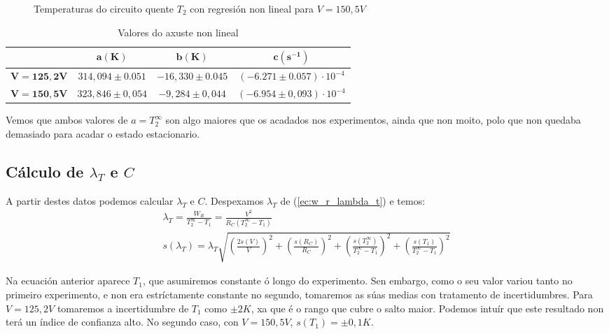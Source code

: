 \documentclass[12pt, a4paper, titlepage]{article}
\begin{document}
  \begin{figure}[H]
    \hspace{12pt}
    
    \caption{Temperaturas do circuito quente $T_2$ con regresión non lineal para $V = 150,5V$}
    \label{fig:v150ar}
  \end{figure}

  \begin{table}[H]
    \centering
    \begin{tabular}{c|c|c|c|}
    \cline{2-4}
                                                & $\mathbf{a(K)}$               & $\mathbf{b(K)}$               & $\mathbf{c(s^{-1})}$   \\ \hline
    \multicolumn{1}{|c|}{$\mathbf{V = 125,2V}$} & $314,094 \pm 0.051$              & $-16,330 \pm 0.045$             & $(-6.271 \pm 0.057) \cdot 10^{-4}$ \\ \hline
    \multicolumn{1}{|c|}{$\mathbf{V = 150,5V}$} & $323,846 \pm 0,054$ & $-9,284 \pm 0,044$ & $(-6.954 \pm 0,093) \cdot 10^{-4}$ \\ \hline
    \end{tabular}
    \caption{Valores do axuste non lineal}
    \label{cadro:4}
  \end{table}

  Vemos que ambos valores de $a = T_2^\infty$ son algo maiores que os acadados nos experimentos, ainda que non moito, polo que non quedaba demasiado para acadar o estado estacionario.

  \subsection{Cálculo de $\lambda_T$ e $C$}

  A partir destes datos podemos calcular $\lambda_T$ e $C$. Despexamos $\lambda_T$ de (\ref{ec:w_r_lambda_t}) e temos:
  \begin{gather}
    \lambda_T = \frac{W_R}{T_2^\infty - T_1} = \frac{V^2}{R_C (T_2^\infty - T_1)} \\
    s(\lambda_T) = \lambda_T \sqrt{\left( \frac{2s(V)}{V} \right)^2 + \left( \frac{s(R_C)}{R_C} \right)^2 + \left( \frac{s(T_2^\infty)}{T_2^\infty - T_1} \right)^2 + \left( \frac{s(T_1)}{T_2^\infty - T_1} \right)^2}
  \end{gather}

  Na ecuación anterior aparece $T_1$, que asumiremos constante ó longo do experimento. Sen embargo, como o seu valor variou tanto no primeiro experimento, e non era estríctamente constante no segundo, tomaremos as súas medias con tratamento de incertidumbres.
  Para $V = 125,2V$ tomaremos a incertidumbre de $T_1$ como $\pm 2K$, xa que é o rango que cubre o salto maior. Podemos intuír que este resultado non terá un índice de confianza alto. No segundo caso, con $V = 150,5V$, $s(T_1) = \pm 0,1K$.
\end{document}
